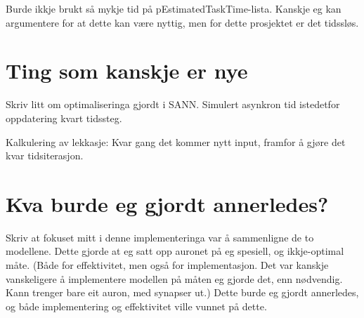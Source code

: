 Burde ikkje brukt så mykje tid på pEstimatedTaskTime-lista. Kanskje eg kan argumentere for at dette kan være nyttig, men for dette prosjektet er det tidssløs.


\section{Ting som kanskje er nye}
Skriv litt om optimaliseringa gjordt i SANN. Simulert asynkron tid istedetfor oppdatering kvart tidssteg.

Kalkulering av lekkasje: Kvar gang det kommer nytt input, framfor å gjøre det kvar tidsiterasjon.

\section{Kva burde eg gjordt annerledes?}
Skriv at fokuset mitt i denne implementeringa var å sammenligne de to modellene. Dette gjorde at eg satt opp auronet på eg spesiell, og ikkje-optimal måte.
(Både for effektivitet, men også for implementasjon. Det var kanskje vanskeligere å implementere modellen på måten eg gjorde det, enn nødvendig. Kann trenger bare eit auron, med synapser ut.)
Dette burde eg gjordt annerledes, og både implementering og effektivitet ville vunnet på dette.






